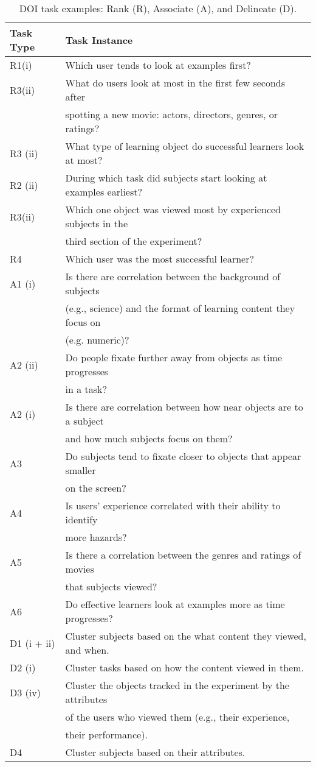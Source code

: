 \begin{table}[htbp]	
\caption{DOI task examples: Rank (R), Associate (A), and Delineate (D).}
	\centering
    \begin{tabular}{|l|l|}
    \hline
    Task Type & Task Instance \\
    \hline
R1(i) & Which user tends to look at examples first?\\
R3(ii) & What do users look at most in the first few seconds after\\& spotting a new movie: actors, directors, genres, or ratings?\\
R3 (ii) & What type of learning object do successful learners look at most?\\
R2 (ii)& During which task did subjects start looking at examples earliest?\\
R3(ii) & Which one object was viewed most by experienced subjects in the\\& third section of the experiment?\\
R4 & Which user was the most successful learner?\\
    \hline
    A1 (i)& Is there are correlation between the background of subjects\\& (e.g., science) and the format of learning content they focus on\\& (e.g. numeric)?\\
A2 (ii)& Do people fixate further away from objects as time progresses\\& in a task?\\
A2 (i) & Is there are correlation between how near objects are to a subject\\& and how much subjects focus on them?\\
A3 & Do subjects tend to fixate closer to objects that appear smaller\\& on the screen?\\
A4& Is users' experience correlated with their ability to identify\\& more hazards? \\
A5& Is there a correlation between the genres and ratings of movies\\& that subjects viewed? \\
A6& Do effective learners look at examples more as time progresses?\\
\hline
D1 (i + ii) & Cluster subjects based on the what content they viewed, and when.\\
D2 (i) & Cluster tasks based on how the content viewed in them. \\
D3 (iv) & Cluster the objects tracked in the experiment by the attributes\\& of the users who viewed them (e.g., their experience,\\& their performance).
\\
D4 & Cluster subjects based on their attributes. \\
\hline
    \end{tabular} 
    
    \label{tab:Tasks2}
\end{table}


